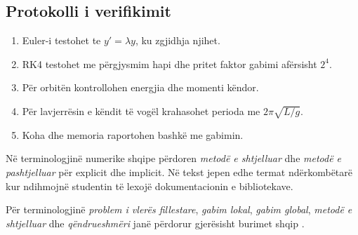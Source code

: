 \subsection{Protokolli i verifikimit}
\begin{enumerate}
\item Euler-i testohet te $y'=\lambda y$, ku zgjidhja njihet.
\item RK4 testohet me përgjysmim hapi dhe pritet faktor gabimi afërsisht $2^4$.
\item Për orbitën kontrollohen energjia dhe momenti këndor.
\item Për lavjerrësin e këndit të vogël krahasohet perioda me $2\pi\sqrt{L/g}$.
\item Koha dhe memoria raportohen bashkë me gabimin.
\end{enumerate}

\begin{kujdes}
Në terminologjinë numerike shqipe përdoren \emph{metodë e shtjelluar} dhe \emph{metodë e pashtjelluar} për explicit dhe implicit. Në tekst jepen edhe termat ndërkombëtarë kur ndihmojnë studentin të lexojë dokumentacionin e bibliotekave.
\end{kujdes}

Për terminologjinë \emph{problem i vlerës fillestare}, \emph{gabim lokal}, \emph{gabim global}, \emph{metodë e shtjelluar} dhe \emph{qëndrueshmëri} janë përdorur gjerësisht burimet shqip \cite{dishmema,hanelli,hoxha,datja,dishmemaArticle}.
